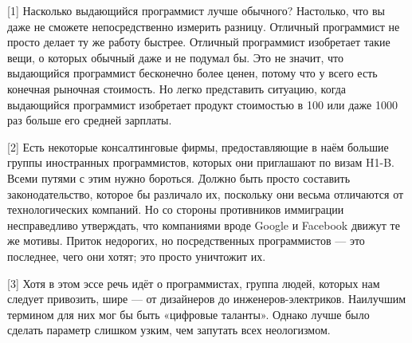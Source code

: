 \documentclass[ebook,12pt,oneside,openany]{memoir}
\begin{document}
[1] Насколько выдающийся программист лучше обычного? Настолько, что вы
даже не сможете непосредственно измерить разницу. Отличный программист
не просто делает ту же работу быстрее. Отличный программист изобретает
такие вещи, о которых обычный даже и не подумал бы. Это не значит, что
выдающийся программист бесконечно более ценен, потому что у всего есть
конечная рыночная стоимость. Но легко представить ситуацию, когда
выдающийся программист изобретает продукт стоимостью в 100 или даже
1000 раз больше его средней зарплаты.

[2] Есть некоторые консалтинговые фирмы, предоставляющие в наём
большие группы иностранных программистов, которых они приглашают по
визам H1-B. Всеми путями с этим нужно бороться. Должно быть просто
составить законодательство, которое бы различало их, поскольку они
весьма отличаются от технологических компаний. Но со стороны
противников иммиграции несправедливо утверждать, что компаниями вроде
Google и Facebook движут те же мотивы. Приток недорогих, но
посредственных программистов — это последнее, чего они хотят; это
просто уничтожит их.

[3] Хотя в этом эссе речь идёт о программистах, группа людей, которых
нам следует привозить, шире — от дизайнеров до инженеров-электриков.
Наилучшим термином для них мог бы быть «цифровые таланты». Однако
лучше было сделать параметр слишком узким, чем запутать всех
неологизмом.
\end{document}
